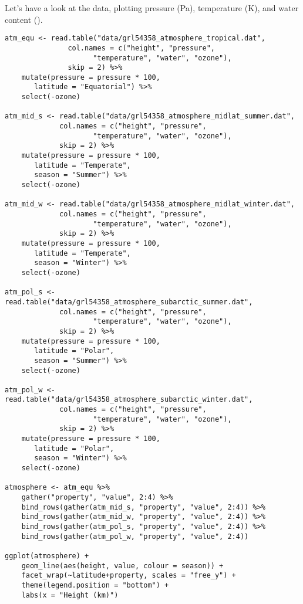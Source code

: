 \documentclass[10pt,a4paper,titlepage]{article}
\begin{document}
Let's have a look at the data, plotting pressure (Pa),
temperature (K), and water content (\gram\per\metre\cubed).
\begin{lstlisting}
atm_equ <- read.table("data/grl54358_atmosphere_tropical.dat",
		       col.names = c("height", "pressure",
				     "temperature", "water", "ozone"),
		       skip = 2) %>%
    mutate(pressure = pressure * 100,
	   latitude = "Equatorial") %>%
    select(-ozone)

atm_mid_s <- read.table("data/grl54358_atmosphere_midlat_summer.dat",
			 col.names = c("height", "pressure",
				     "temperature", "water", "ozone"),
			 skip = 2) %>%
    mutate(pressure = pressure * 100,
	   latitude = "Temperate",
	   season = "Summer") %>%
    select(-ozone)

atm_mid_w <- read.table("data/grl54358_atmosphere_midlat_winter.dat",
			 col.names = c("height", "pressure",
				     "temperature", "water", "ozone"),
			 skip = 2) %>%
    mutate(pressure = pressure * 100,
	   latitude = "Temperate",
	   season = "Winter") %>%
    select(-ozone)

atm_pol_s <- read.table("data/grl54358_atmosphere_subarctic_summer.dat",
			 col.names = c("height", "pressure",
				     "temperature", "water", "ozone"),
			 skip = 2) %>%
    mutate(pressure = pressure * 100,
	   latitude = "Polar",
	   season = "Summer") %>%
    select(-ozone)

atm_pol_w <- read.table("data/grl54358_atmosphere_subarctic_winter.dat",
			 col.names = c("height", "pressure",
				     "temperature", "water", "ozone"),
			 skip = 2) %>%
    mutate(pressure = pressure * 100,
	   latitude = "Polar",
	   season = "Winter") %>%
    select(-ozone)

atmosphere <- atm_equ %>%
    gather("property", "value", 2:4) %>%
    bind_rows(gather(atm_mid_s, "property", "value", 2:4)) %>%
    bind_rows(gather(atm_mid_w, "property", "value", 2:4)) %>%
    bind_rows(gather(atm_pol_s, "property", "value", 2:4)) %>%
    bind_rows(gather(atm_pol_w, "property", "value", 2:4))

ggplot(atmosphere) +
    geom_line(aes(height, value, colour = season)) +
    facet_wrap(~latitude+property, scales = "free_y") +
    theme(legend.position = "bottom") +
    labs(x = "Height (km)")
\end{lstlisting}
\end{document}
